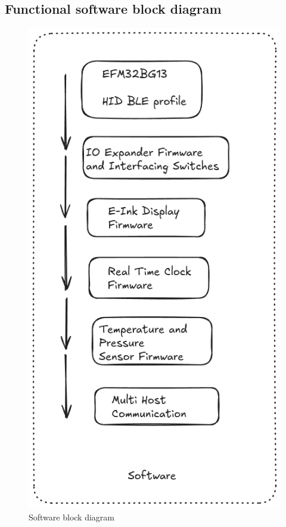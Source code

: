 \documentclass[a4paper,11pt]{article}%
\begin{document}
\pagebreak
\subsection{Functional software block diagram}
\begin{figure}[H]
    \centering
    \includegraphics[scale=0.44]{figures/software_diagram.png}
    \caption{Software block diagram}
\end{figure}
\vspace{0.2cm}
\end{document}

